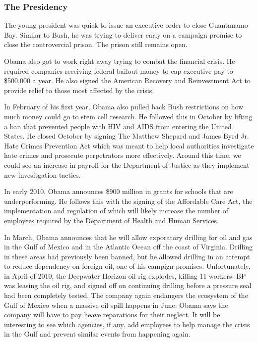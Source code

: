 \documentclass{article}
\begin{document}
        \subsubsection{The Presidency}
        The young president was quick to issue an executive order to close Guantanamo Bay. Similar to Bush, he was trying to deliver early on a campaign promise to close the controvercial prison. The prison still remains open.
        \par
        Obama also got to work right away trying to combat the financial crisis. He required companies receiving federal bailout money to cap executive pay to \$500,000 a year. He also signed the American Recovery and Reinvestment Act to provide relief to those most affected by the crisis.\cite{obamaevents}
        \par
        In February of his first year, Obama also pulled back Bush restrictions on how much money could go to stem cell research. He followed this in October by lifting a ban that prevented people with HIV and AIDS from entering the United States. He closed October by signing The Matthew Shepard and James Byrd Jr. Hate Crimes Prevention Act which was meant to help local authorities investigate hate crimes and prosecute perpetrators more effectively.\cite{obamaevents} Around this time, we could see an increase in payroll for the Department of Justice as they implement new invesitgation tactics.
        \par
        In early 2010, Obama announces \$900 million in grants for schools that are underperforming. He follows this with the signing of the Affordable Care Act, the implementation and regulation of which will likely increase the number of employees required by the Department of Health and Human Services.
        \par
        In March, Obama announces that he will allow exporatory drilling for oil and gas in the Gulf of Mexico and in the Atlantic Ocean off the coast of Virginia. Drilling in these areas had previously been banned, but he allowed drilling in an attempt to reduce dependency on foreign oil, one of his campign promises. Unfortunately, in April of 2010, the Deepwater Horizon oil rig explodes, killing 11 workers. BP was leasing the oil rig, and signed off on continuing drilling before a pressure seal had been completely tested. The company again endangers the ecosystem of the Gulf of Mexico when a massive oil spill happens in June. Obama says the company will have to pay heave reparations for their neglect.\cite{obamaevents} It will be interesting to see which agencies, if any, add employees to help manage the crisis in the Gulf and prevent similar events from happening again.
\end{document}

